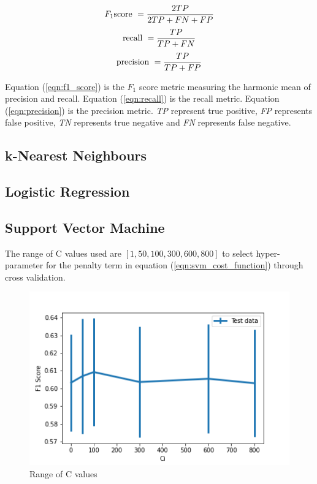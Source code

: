 \documentclass[transmag]{IEEEtran}
\begin{document}
\begin{equation}
\label{eqn:f1_score}
F_1 \textnormal{score}\ = \frac{2TP}{2TP+FN+FP}
\end{equation}
\begin{equation}
\label{eqn:recall}
\textnormal{recall}\ = \frac{TP}{TP+FN}
\end{equation}
\begin{equation}
\label{eqn:precision}
\textnormal{precision}\ = \frac{TP}{TP+FP}
\end{equation}

\noindent Equation (\ref{eqn:f1_score}) is the $F_1$ score metric measuring the harmonic mean of precision and recall. Equation (\ref{eqn:recall}) is the recall metric. Equation (\ref{eqn:precision}) is the precision metric. \emph{TP} represent true positive, \emph{FP} represents false positive, \emph{TN} represents true negative and \emph{FN} represents false negative.

\subsection{k-Nearest Neighbours}

\subsection{Logistic Regression}

\subsection{Support Vector Machine}
\noindent The range of C values used are $[1, 50, 100, 300, 600, 800]$ to select hyper-parameter for the penalty term in equation (\ref{eqn:svm_cost_function}) through cross validation.

\begin{figure}[h]
	\includegraphics[width=\columnwidth]{svm_cv_ci.png} 
    \caption{Range of C values}%
    \label{fig:svm_c}%
\end{figure}
\end{document}
